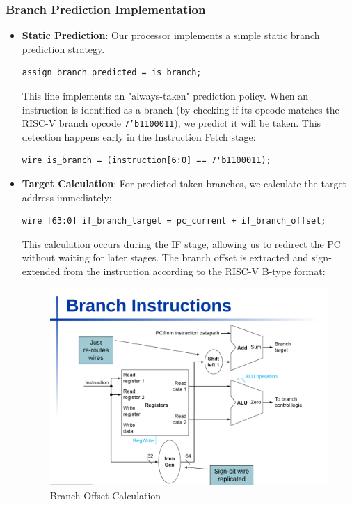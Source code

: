 \documentclass{article}
\numberwithin{figure}{section}
\numberwithin{table}{section}
\begin{document}
\subsubsection{Branch Prediction Implementation}

\begin{itemize}
\item \textbf{Static Prediction}: Our processor implements a simple static branch prediction strategy.

\begin{lstlisting}[style=verilog-style]
assign branch_predicted = is_branch;\end{lstlisting}

    This line implements an "always-taken" prediction policy. When an instruction is identified as a branch (by checking if its opcode matches the RISC-V branch opcode \texttt{7'b1100011}), we predict it will be taken. This detection happens early in the Instruction Fetch stage:

    \begin{lstlisting}[style=verilog-style]
        wire is_branch = (instruction[6:0] == 7'b1100011);        
    \end{lstlisting}

\item \textbf{Target Calculation}: For predicted-taken branches, we calculate the target address immediately:

\begin{lstlisting}[style=verilog-style]
wire [63:0] if_branch_target = pc_current + if_branch_offset;\end{lstlisting}
    
    This calculation occurs during the IF stage, allowing us to redirect the PC without waiting for later stages. The branch offset is extracted and sign-extended from the instruction according to the RISC-V B-type format:
    
    \begin{figure}[H]
        \centering
        \includegraphics[width=0.6\linewidth]{branchshift.png}
        \caption{Branch Offset Calculation}
        \label{fig:branch-offset}
    \end{figure}
    

\end{itemize}
\end{document}
